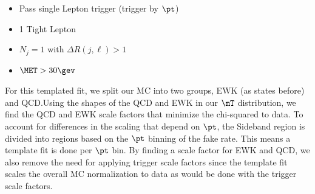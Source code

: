 \begin{itemize}
  \item Pass single Lepton trigger (trigger by $\pt$)
  \item 1 Tight Lepton
  \item $N_{j} = 1$ with $\Delta R(j, \ell) > 1$
  \item $\MET > 30\gev$
\end{itemize}

For this templated fit, we split our MC into two groups, EWK (as states before) and QCD.\@ Using the shapes of the QCD and EWK in our $\mT$ distribution, we find the QCD and EWK scale factors that minimize the chi-squared to data. To account for differences in the scaling that depend on $\pt$, the Sideband region is divided into regions based on the $\pt$ binning of the fake rate. This means a template fit is done per $\pt$ bin. By finding a scale factor for EWK and QCD, we also remove the need for applying trigger scale factors since the template fit scales the overall MC normalization to data as would be done with the trigger scale factors.

